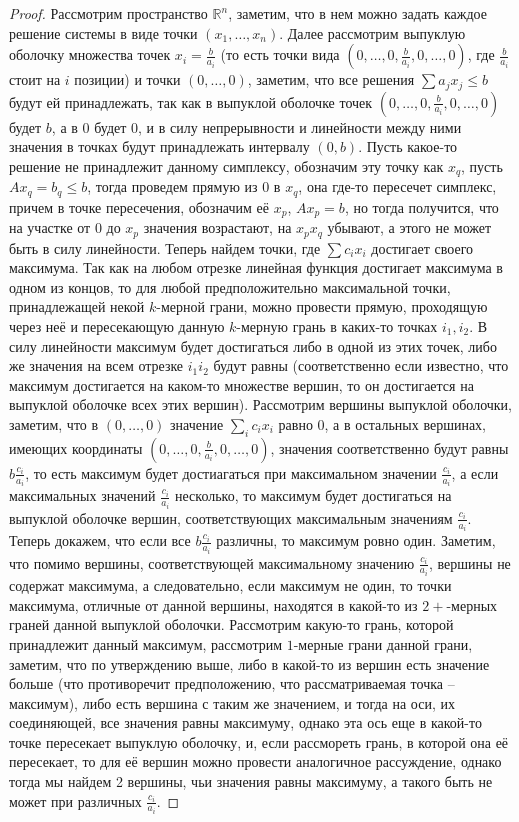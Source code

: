 \begin{proof}
    Рассмотрим пространство $\mathbb{R}^n$, заметим, что в нем можно задать каждое решение системы в виде точки $(x_1, \ldots, x_n)$. Далее рассмотрим выпуклую оболочку множества точек $x_i = \frac{b}{a_i}$ (то есть точки вида $(0, \ldots, 0, \frac{b}{a_i}, 0, \ldots, 0)$, где $\frac{b}{a_i}$ стоит на $i$ позиции) и точки $(0, \ldots, 0)$, заметим, что все решения $\sum a_j x_j \leqslant b$ будут ей принадлежать, так как в выпуклой оболочке точек $(0, \ldots, 0, \frac{b}{a_i}, 0, \ldots, 0)$ будет $b$, а в $0$ будет $0$, и в силу непрерывности и линейности между ними значения в точках будут принадлежать интервалу $(0, b)$. Пусть какое-то решение не принадлежит данному симплексу, обозначим эту точку как $x_q$, пусть $Ax_q = b_q \leqslant b$, тогда проведем прямую из 0 в $x_q$, она где-то пересечет симплекс, причем в точке пересечения, обозначим её $x_p$, $A x_p = b$, но тогда получится, что на участке от $0$ до $x_p$ значения возрастают, на $x_px_q$ убывают, а этого не может быть в силу линейности.
    \vskip0.1in \noindent
    Теперь найдем точки, где $\sum c_i x_i$ достигает своего максимума.
    \vskip0.1in \noindent
    Так как на любом отрезке линейная функция достигает максимума в одном из концов, то для любой предположительно максимальной точки, принадлежащей некой $k$-мерной грани, можно провести прямую, проходящую через неё и пересекающую данную $k$-мерную грань в каких-то точках $i_1, i_2$. В силу линейности максимум будет достигаться либо в одной из этих точек, либо же значения на всем отрезке $i_1 i_2$ будут равны (соответственно если известно, что максимум достигается на каком-то множестве вершин, то он достигается на выпуклой оболочке всех этих вершин).
    \vskip0.1in \noindent
    Рассмотрим вершины выпуклой оболочки, заметим, что в $(0, \ldots, 0)$ значение $\sum_i c_i x_i$ равно $0$, а в остальных вершинах, имеющих координаты $(0, \ldots, 0, \frac{b}{a_i}, 0, \ldots, 0)$, значения соответственно будут равны $b\frac{c_i}{a_i}$, то есть максимум будет достиагаться при максимальном значении $\frac{c_i}{a_i}$, а если максимальных значений $\frac{c_i}{a_i}$ несколько, то максимум будет достигаться на выпуклой оболочке вершин, соответствующих максимальным значениям $\frac{c_i}{a_i}$.
    \vskip0.1in \noindent
    Теперь докажем, что если все $b \frac{c_i}{a_i}$ различны, то максимум ровно один. Заметим, что помимо вершины, соответствующей максимальному значению $\frac{c_i}{a_i}$, вершины не содержат максимума, а следовательно, если максимум не один, то точки максимума, отличные от данной вершины, находятся в какой-то из $2+$-мерных граней данной выпуклой оболочки. Рассмотрим какую-то грань, которой принадлежит данный максимум, рассмотрим $1$-мерные грани данной грани, заметим, что по утверждению выше, либо в какой-то из вершин есть значение больше (что противоречит предположению, что рассматриваемая точка -- максимум), либо есть вершина с таким же значением, и тогда на оси, их соединяющей, все значения равны максимуму, однако эта ось еще в какой-то точке пересекает выпуклую оболочку, и, если рассмореть грань, в которой она её пересекает, то для её вершин можно провести аналогичное рассуждение, однако тогда мы найдем 2 вершины, чьи значения равны максимуму, а такого быть не может при различных $\frac{c_i}{a_i}$.
\end{proof}
